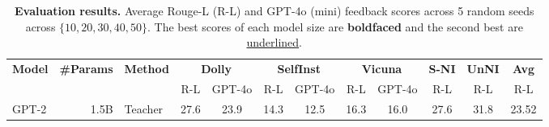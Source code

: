 \begin{table}[!t]
    \centering
    \small
    \caption{\textbf{Evaluation results.} Average Rouge-L (R-L) and GPT-4o (mini) feedback scores across 5 random seeds across $\{10,20,30,40,50\}$. The best scores of each model size are \textbf{boldfaced} and the second best are \underline{underlined}. }
    \begin{tabular}{lrl|cc|cc|cc|c|c||c}
    \toprule
    \multirow{2}{*}{\textbf{Model}} & \multirow{2}{*}{\textbf{\#Params}} & \multirow{2}{*}{\textbf{Method}}
    & \multicolumn{2}{c|}{\textbf{Dolly}} & \multicolumn{2}{c|}{\textbf{SelfInst}}  & \multicolumn{2}{c|}{\textbf{Vicuna}} & \textbf{S-NI} & \textbf{UnNI} & \textbf{Avg}\\
    \cmidrule{4-12}
      & &  &  R-L & GPT-4o & R-L & GPT-4o & R-L & GPT-4o & R-L & R-L & R-L    \\ 
     \midrule
     \multirow{20}{*}{GPT-2}
      & 1.5B & Teacher &  27.6 & 23.9 & 14.3 & 12.5 & 16.3 & 16.0 & 27.6 & 31.8 & 23.52    \\ 
      \cmidrule{2-12}


\end{tabular}
\end{table}
